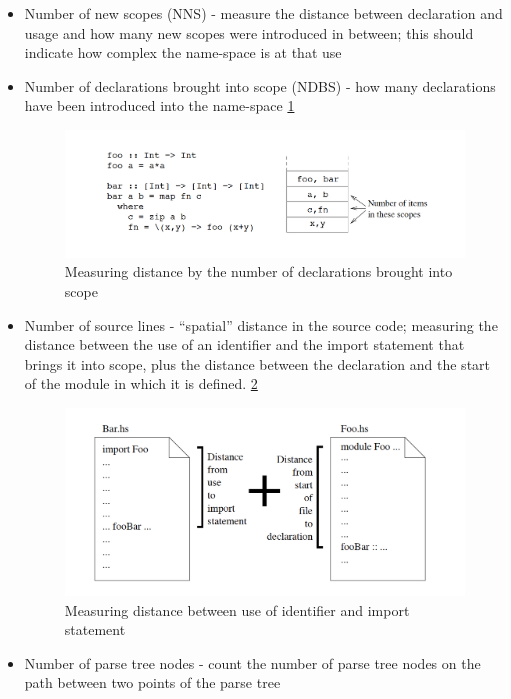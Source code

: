 \documentclass{article}
\begin{document}
\begin{itemize}
\item Number of new scopes (NNS) - measure the distance between declaration and usage and how many new scopes were introduced in between; this should indicate how complex the name-space is at that use
\item Number of declarations brought into scope (NDBS) - how many declarations have been introduced into the name-space \ref{fig:scope-distance}

\begin{figure}[h!]
  \includegraphics[width=\linewidth]{scope-distance.png}
  \caption{Measuring distance by the number of declarations brought into scope}
  \label{fig:scope-distance}
\end{figure}

\item Number of source lines - “spatial” distance in the source code; measuring the distance between the use of an identifier and the import statement that brings it into scope, plus the distance between the declaration and the start of the module in which it is defined. \ref{fig:scope-measure}

\begin{figure}[h!]
  \includegraphics[width=\linewidth]{scope-measure.png}
  \caption{Measuring distance between use of identifier and import statement }
  \label{fig:scope-measure}
\end{figure}

\item Number of parse tree nodes - count the number of parse tree nodes on the path between two points of the parse tree

\end{itemize}
\end{document}
